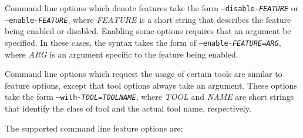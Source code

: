 Command line options which denote features take the form
{\tt --disable-{\em FEATURE}} or
{\tt --enable-{\em FEATURE}}, where {\em FEATURE} is a short string that
describes the feature being enabled or disabled.
Enabling some options requires that an argument be specified.
In these cases, the syntax takes the form of
{\tt --enable-{\em FEATURE}={\em ARG}}, where {\em ARG} is an argument
specific to the feature being enabled.

Command line options which request the usage of certain tools are
similar to feature options, except that tool options always take an
argument.
These options take the form
{\tt --with-{\em TOOL}={\em TOOLNAME}}, where {\em TOOL} and {\em NAME}
are short strings that identify the class of tool and the actual tool name,
respectively.

The supported command line feature options are: \\

